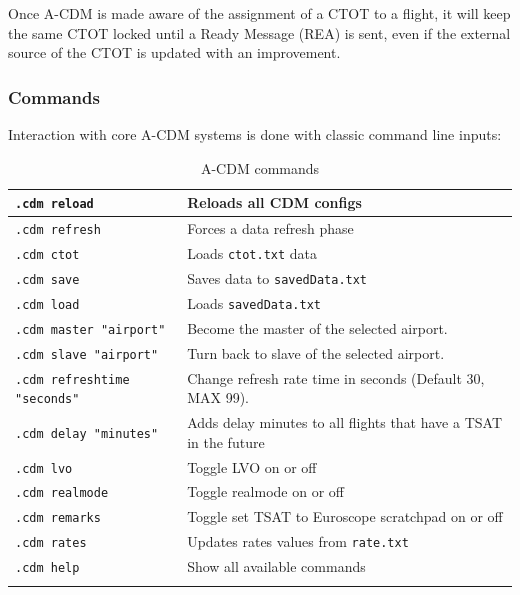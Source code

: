 \documentclass[a4paper,oneside,11pt]{memoir}
\begin{document}
\medskip

Once A-CDM is made aware of the assignment of a CTOT to a flight, it will keep the same CTOT locked until a Ready Message (REA) is sent, even if the external source of the CTOT is updated with an improvement. 

\subsubsection{Commands}

Interaction with core A-CDM systems is done with classic command line inputs:

\begin{longtable}{|p{5cm}|p{8.5cm}|}
  \hline
  \texttt{.cdm reload}                 & Reloads all CDM configs\\ \hline
  \texttt{.cdm refresh}                & Forces a data refresh phase\\ \hline
  \texttt{.cdm ctot}                   & Loads \texttt{ctot.txt} data\\ \hline
  \texttt{.cdm save}                   & Saves data to \texttt{savedData.txt}\\ \hline
  \texttt{.cdm load}                   & Loads \texttt{savedData.txt}\\ \hline
  \texttt{.cdm master "airport"}       & Become the master of the selected airport.\\ \hline
  \texttt{.cdm slave "airport"}        & Turn back to slave of the selected airport.\\ \hline
  \texttt{.cdm refreshtime "seconds"}  & Change refresh rate time in seconds (Default 30, MAX 99).\\ \hline
  \texttt{.cdm delay "minutes"}        & Adds delay minutes to all flights that have a TSAT in the future\\ \hline
  \texttt{.cdm lvo}                    & Toggle LVO on or off\\ \hline
  \texttt{.cdm realmode}               & Toggle realmode on or off\\ \hline
  \texttt{.cdm remarks}                & Toggle set TSAT to Euroscope scratchpad on or off\\ \hline
  \texttt{.cdm rates}                  & Updates rates values from \texttt{rate.txt}\\ \hline
  \texttt{.cdm help}                   & Show all available commands \\ \hline
  \caption{A-CDM commands}
  \label{tab:acdm-commands}
\end{longtable}
\end{document}

